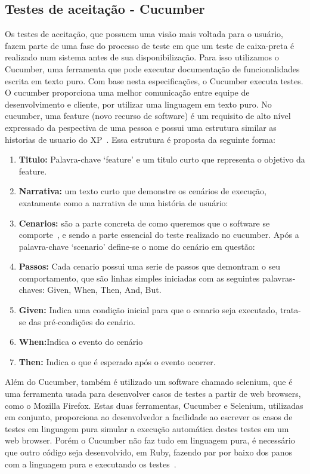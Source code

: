 \subsection{Testes de aceitação - Cucumber}
Os testes de aceitação, que possuem uma visão mais voltada para o usuário, fazem 
parte de uma fase do processo de teste em que um teste de caixa-preta é realizado 
num sistema antes de sua disponibilização. Para isso utilizamos o Cucumber, uma 
ferramenta que pode executar documentação de funcionalidades escrita em texto puro. 
Com base nesta especificações, o Cucumber executa testes.
%
O cucumber proporciona uma melhor comunicação entre equipe de desenvolvimento e 
cliente, por utilizar uma linguagem  em texto puro.
%
No cucumber, uma feature (novo recurso de software) é um requisito de alto nível 
expressado da pespectiva de uma pessoa e possui uma estrutura similar as historias 
de usuario do XP~\cite{chelimsky2010}. Essa estrutura é proposta da seguinte forma:
\begin{enumerate}
\item \textbf{Titulo:} Palavra-chave ‘feature’ e um titulo curto que representa o 
objetivo da feature.
\item \textbf{Narrativa:} um texto curto que demonstre os cenários de execução, 
exatamente como a narrativa de uma história de usuário:
%
\item \textbf{Cenarios:} são a parte concreta de como queremos que o software se 
comporte~\cite{chelimsky2010}, e sendo a parte essencial do teste realizado no 
cucumber. Após a palavra-chave ‘scenario’ define-se o nome do cenário em questão:
%
\item \textbf{Passos:} Cada cenario possui uma serie de passos que demontram o seu 
comportamento, que são linhas simples iniciadas com as seguintes palavras-chaves: 
Given, When, Then, And, But.
\item \textbf{Given:} Indica uma condição inicial para que o cenario seja executado, 
trata-se das pré-condições do cenário.
\item \textbf{When:}Indica o evento do cenário
\item \textbf{Then:} Indica o que é esperado após o evento ocorrer.
\end{enumerate}
Além do Cucumber, também é utilizado um software chamado selenium, que é uma ferramenta
usada para desenvolver casos de testes a partir de web browsers, como o Mozilla Firefox. 
Estas duas ferramentas, Cucumber e Selenium, utilizadas em conjunto, proporciona ao desenvolvedor
a facilidade ao escrever os casos de testes em linguagem pura simular a execução automática
destes testes em um web browser.
%
Porém o Cucumber não faz tudo em linguagem pura, é necessário que outro código seja desenvolvido,
em Ruby, fazendo par por baixo dos panos com a linguagem pura e executando os testes~\cite{akita2011}.

